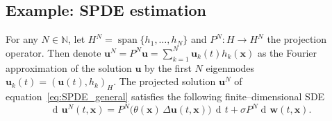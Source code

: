 \documentclass[11pt]{article} %
\def\eqref#1{equation~\ref{#1}}
\def\rvu{{\mathbf{i}}}
\def\rvu{{\mathbf{u}}}
\def\rvw{{\mathbf{w}}}
\def\rvx{{\mathbf{x}}}
\DeclareMathOperator{\dif}{d \!}        %
\DeclareMathOperator{\spn}{span}
\begin{document}
\subsection{Example: SPDE estimation}
%
For any $N\in\mathbb{N}$, let $H^{N}=\spn\{h_1,\dots,h_N\}$ and $P^{N}\colon H\to H^{N}$ the projection operator. Then denote $\rvu^N = P^N \rvu = \sum_{k=1}^{N} \rvu_k(t) h_k(\rvx)$ as the Fourier  approximation of the solution $\rvu$ by the first $N$ eigenmodes $\rvu_k(t)=(\rvu(t), h_k)_H$. The projected solution $\rvu^N$ of \eqref{eq:SPDE_general} satisfies the following finite–dimensional SDE 
\begin{equation}\label{eq:true projected SPDE}
  \dif\rvu^{N}(t, \rvx)
  =
  P^{N}\!\bigl(\theta(\rvx)\,\Delta\rvu(t,\rvx)\bigr)\,\dif t
  +
  \sigma P^{N}\dif\rvw(t,\rvx).
\end{equation}
\end{document}

